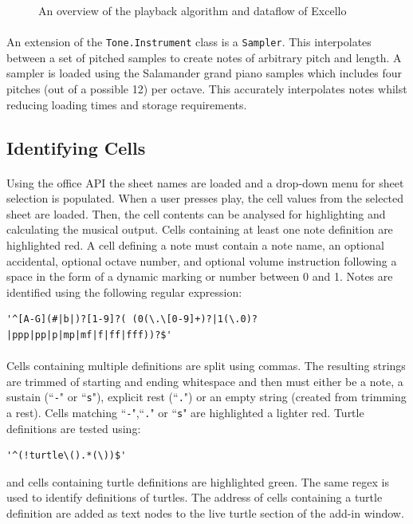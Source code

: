 \begin{figure}[tbh]
\begin{center}

\end{center}
\caption{An overview of the playback algorithm and dataflow of Excello}
\label{fig:overview}
\end{figure}

\paragraph{} An extension of the \texttt{Tone.Instrument} class is a \texttt{Sampler}. This interpolates between a set of pitched samples to create notes of arbitrary pitch and length. A sampler is loaded using the Salamander grand piano samples which includes four pitches (out of a possible 12) per octave. This accurately interpolates notes whilst reducing loading times and storage requirements.

\subsection{Identifying Cells}

\paragraph{} Using the office API the sheet names are loaded and a drop-down menu for sheet selection is populated. When a user presses play, the cell values from the selected sheet are loaded. Then, the cell contents can be analysed for highlighting and calculating the musical output. Cells containing at least one note definition are highlighted red. A cell defining a note must contain a note name, an optional accidental, optional octave number, and optional volume instruction following a space in the form of a dynamic marking or number between 0 and 1. Notes are identified using the following regular expression:

\begin{verbatim}
'^[A-G](#|b|)?[1-9]?( (0(\.\[0-9]+)?|1(\.0)?|ppp|pp|p|mp|mf|f|ff|fff))?$'
\end{verbatim}

\paragraph{} Cells containing multiple definitions are split using commas. The resulting strings are trimmed of starting and ending whitespace and then must either be a note, a sustain (``\texttt{-}" or ``\texttt{s}"), explicit rest (``\texttt{.}") or an empty string (created from trimming a rest). Cells matching ``\texttt{-}",``\texttt{.}" or ``\texttt{s}" are highlighted a lighter red. Turtle definitions are tested using:
\begin{verbatim}
'^(!turtle\().*(\))$'
\end{verbatim}
and cells containing turtle definitions are highlighted green. The same regex is used to identify definitions of turtles. The address of cells containing a turtle definition are added as text nodes to the live turtle section of the add-in window.

